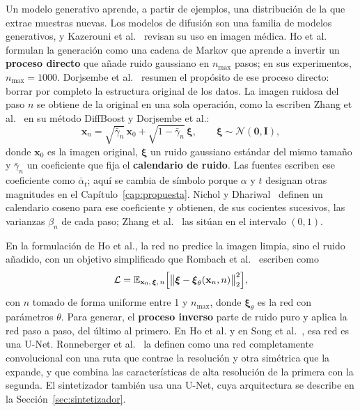 Un modelo generativo aprende, a partir de ejemplos, una distribución de la que extrae muestras nuevas. Los modelos de difusión son una familia de modelos generativos, y Kazerouni et al.~\cite{kazerouni2023diffusionsurvey} revisan su uso en imagen médica. Ho et al.~\cite{ho2020denoising} formulan la generación como una cadena de Markov que aprende a invertir un \textbf{proceso directo} que añade ruido gaussiano en $n_{\max}$ pasos; en sus experimentos, $n_{\max} = 1000$. Dorjsembe et al.~\cite{dorjsembe2024} resumen el propósito de ese proceso directo: borrar por completo la estructura original de los datos. La imagen ruidosa del paso $n$ se obtiene de la original en una sola operación, como la escriben Zhang et al.~\cite{zhang2025diffboost} en su método DiffBoost y Dorjsembe et al.:
\begin{equation}
\mathbf{x}_n = \sqrt{\bar{\gamma}_n}\,\mathbf{x}_0 + \sqrt{1 - \bar{\gamma}_n}\,\boldsymbol{\xi}, \qquad \boldsymbol{\xi} \sim \mathcal{N}(\mathbf{0}, \mathbf{I}),
\label{eq:difusion-directa}
\end{equation}
donde $\mathbf{x}_0$ es la imagen original, $\boldsymbol{\xi}$ un ruido gaussiano estándar del mismo tamaño y $\bar{\gamma}_n$ un coeficiente que fija el \textbf{calendario de ruido}. Las fuentes escriben ese coeficiente como $\bar{\alpha}_t$; aquí se cambia de símbolo porque $\alpha$ y $t$ designan otras magnitudes en el Capítulo~\ref{cap:propuesta}. Nichol y Dhariwal~\cite{nichol2021improved} definen un calendario coseno para ese coeficiente y obtienen, de sus cocientes sucesivos, las varianzas $\beta_n$ de cada paso; Zhang et al.~\cite{zhang2025diffboost} las sitúan en el intervalo $(0, 1)$.

En la formulación de Ho et al., la red no predice la imagen limpia, sino el ruido añadido, con un objetivo simplificado que Rombach et al.~\cite{rombach2022latentdiffusion} escriben como
\begin{equation}
\mathcal{L} = \mathbb{E}_{\mathbf{x}_0,\, \boldsymbol{\xi},\, n}\Bigl[\bigl\lVert \boldsymbol{\xi} - \boldsymbol{\xi}_{\theta}(\mathbf{x}_n, n) \bigr\rVert_2^2\Bigr],
\label{eq:perdida-difusion}
\end{equation}
con $n$ tomado de forma uniforme entre 1 y $n_{\max}$, donde $\boldsymbol{\xi}_{\theta}$ es la red con parámetros $\theta$. Para generar, el \textbf{proceso inverso} parte de ruido puro y aplica la red paso a paso, del último al primero. En Ho et al. y en Song et al.~\cite{song2021ddim}, esa red es una U-Net. Ronneberger et al.~\cite{ronnenberger2015unet} la definen como una red completamente convolucional con una ruta que contrae la resolución y otra simétrica que la expande, y que combina las características de alta resolución de la primera con la segunda. El sintetizador también usa una U-Net, cuya arquitectura se describe en la Sección~\ref{sec:sintetizador}.

